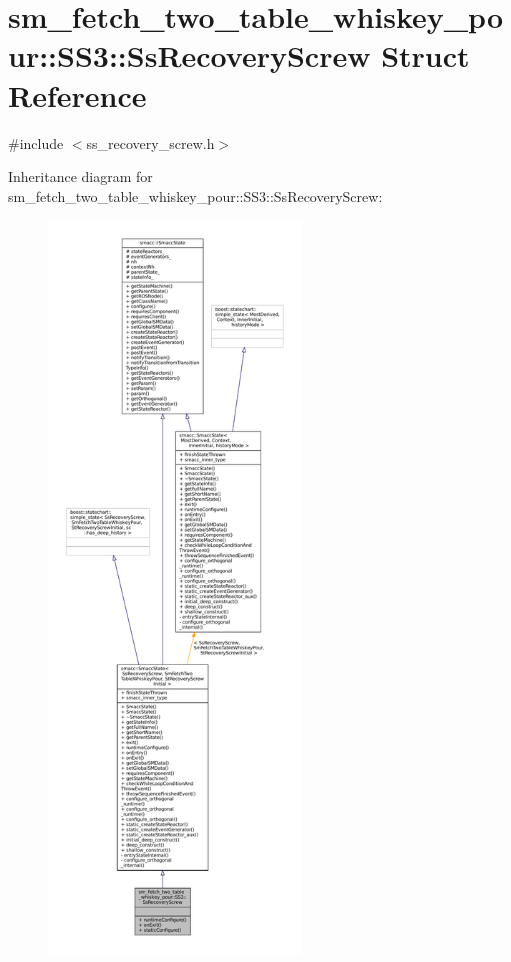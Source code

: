 \hypertarget{structsm__fetch__two__table__whiskey__pour_1_1SS3_1_1SsRecoveryScrew}{}\section{sm\+\_\+fetch\+\_\+two\+\_\+table\+\_\+whiskey\+\_\+pour\+:\+:S\+S3\+:\+:Ss\+Recovery\+Screw Struct Reference}
\label{structsm__fetch__two__table__whiskey__pour_1_1SS3_1_1SsRecoveryScrew}


{\ttfamily \#include $<$ss\+\_\+recovery\+\_\+screw.\+h$>$}



Inheritance diagram for sm\+\_\+fetch\+\_\+two\+\_\+table\+\_\+whiskey\+\_\+pour\+:\+:S\+S3\+:\+:Ss\+Recovery\+Screw\+:
\nopagebreak
\begin{figure}[H]
\begin{center}
\leavevmode
\includegraphics[height=550pt]{structsm__fetch__two__table__whiskey__pour_1_1SS3_1_1SsRecoveryScrew__inherit__graph}
\end{center}
\end{figure}


